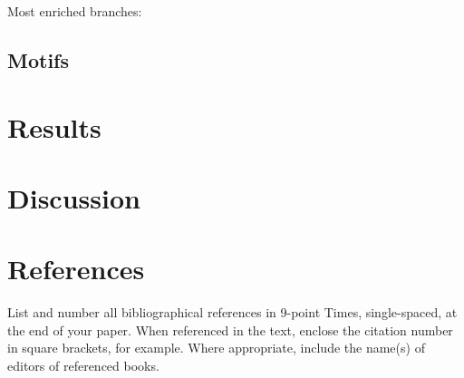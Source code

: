 \documentclass[10pt,twocolumn,letterpaper]{article}
\begin{document}
Most enriched branches:\\



\subsection{Motifs}


\section{Results}

\section{Discussion}




\section{References}

List and number all bibliographical references in 9-point Times,
single-spaced, at the end of your paper. When referenced in the text,
enclose the citation number in square brackets, for
example.  Where appropriate, include the name(s) of
editors of referenced books.

%
%
\end{document}
